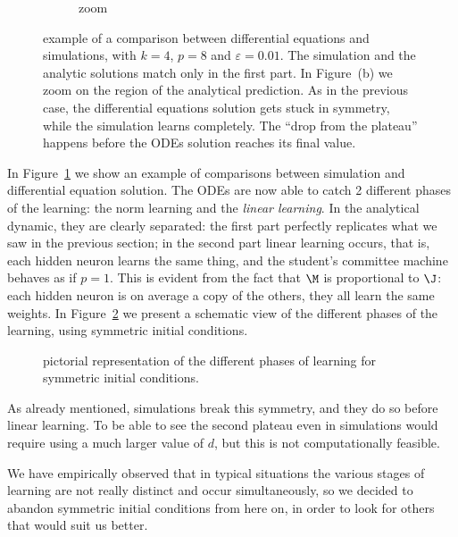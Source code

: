 \begin{figure}
\begin{subfigure}{0.495\textwidth}
    \caption{zoom}
  \end{subfigure}
  \caption{
    example of a comparison between differential equations and simulations, with \(k=4\), \(p=8\) and \(\varepsilon=0.01\).
    The simulation and the analytic solutions match only in the first part.
    In Figure~(b) we zoom on the region of the analytical prediction.
    As in the previous case, the differential equations solution gets stuck in symmetry,
    while the simulation learns completely. The ``drop from the plateau'' happens before 
    the ODEs solution reaches its final value. 
  }
  \label{fig:example-small-eps}
\end{figure}

In Figure~\ref{fig:example-small-eps} we show an example of comparisons between simulation
and differential equation solution. The ODEs are now able to catch 2 different phases of 
the learning: the norm learning and the \emph{linear learning}. In the analytical dynamic,
they are clearly separated: the first part perfectly replicates what we saw in the previous section;
in the second part linear learning occurs, that is, each hidden neuron learns the same thing,
and the student's committee machine behaves as if \(p=1\).
This is evident from the fact that \(\M\) is proportional to \(\J\):
each hidden neuron is on average a copy of the others, they all learn the same weights.
In Figure~\ref{fig:pictorial-symmetric-learning} we present a schematic view of the different phases of the learning,
using symmetric initial conditions.
\begin{figure}
  \centering
  \begin{tikzpicture}[
    x=1.cm,
    y=1.cm
  ]
    
  \end{tikzpicture}
  
  \caption{
    pictorial representation of the different phases of learning for symmetric initial conditions.
  }
  \label{fig:pictorial-symmetric-learning}
\end{figure}

As already mentioned, simulations break this symmetry, and they do so before linear learning.
To be able to see the second plateau even in simulations would require using a much larger value of \(d\),
but this is not computationally feasible. 

We have empirically observed that in typical situations the various stages of learning are not really distinct and occur simultaneously,
so we decided to abandon symmetric initial conditions from here on,
in order to look for others that would suit us better.


